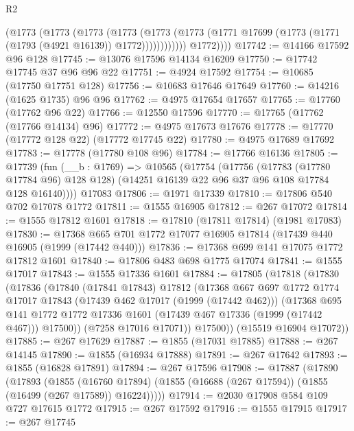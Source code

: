 \begin{lexlean}{R2}
\begin{coremodule}
                  (@1773
                    (@1773
                      (@1773
                        (@1773
                          (@1773
                            (@1773
                              (@1771 @17699 (@1773 (@1771 (@1793 (@4921 @16139)) @1772))))))))))))
            @1772))))
@17742 := @14166 @17592 @96 @128
@17745 := @13076 @17596 @14134 @16209
@17750 := @17742 @17745 @37 @96 @96 @22
@17751 := @4924 @17592
@17754 := @10685 (@17750 @17751 @128)
@17756 := @10683 @17646 @17649
@17760 := @14216 (@1625 @1735) @96 @96
@17762 := @4975 @17654 @17657
@17765 := @17760 (@17762 @96 @22)
@17766 := @12550 @17596
@17770 := @17765 (@17762 (@17766 @14134) @96)
@17772 := @4975 @17673 @17676
@17778 := @17770 (@17772 @128 @22) (@17772 @17745 @22)
@17780 := @4975 @17689 @17692
@17783 := @17778 (@17780 @108 @96)
@17784 := @17766 @16136
@17805 := @17739
    (fun (__b : @1769) =>
    @10565
      (@17754
        (@17756
          (@17783 (@17780 @17784 @96) @128 @128)
          (@14251 @16139 @22 @96 @37 @96 @108 @17784 @128 @16140))))
    @17083
@17806 := @1971 @17339
@17810 := @17806 @540 @702 @17078 @1772
@17811 := @1555 @16905
@17812 := @267 @17072
@17814 := @1555 @17812 @1601
@17818 := @17810 (@17811 @17814) (@1981 @17083)
@17830 := @17368 @665 @701 @1772 @17077 @16905 @17814 (@17439 @440 @16905 (@1999 (@17442 @440)))
@17836 := @17368 @699 @141 @17075 @1772 @17812 @1601
@17840 := @17806 @483 @698 @1775 @17074
@17841 := @1555 @17017
@17843 := @1555 @17336 @1601
@17884 := @17805
    (@17818
      (@17830
        (@17836
          (@17840
            (@17841 @17843)
            @17812
            (@17368
              @667
              @697
              @1772
              @1774
              @17017
              @17843
              (@17439 @462 @17017 (@1999 (@17442 @462)))
              (@17368
                @695
                @141
                @1772
                @1772
                @17336
                @1601
                (@17439 @467 @17336 (@1999 (@17442 @467)))
                @17500))
            (@7258 @17016 @17071))
          @17500))
      (@15519 @16904 @17072))
@17885 := @267 @17629
@17887 := @1855 (@17031 @17885)
@17888 := @267 @14145
@17890 := @1855 (@16934 @17888)
@17891 := @267 @17642
@17893 := @1855 (@16828 @17891)
@17894 := @267 @17596
@17908 := @17887
    (@17890
      (@17893
        (@1855
          (@16760 @17894)
          (@1855 (@16688 (@267 @17594)) (@1855 (@16499 (@267 @17589)) @16224)))))
@17914 := @2030 @17908 @584 @109 @727 @17615 @1772
@17915 := @267 @17592
@17916 := @1555 @17915
@17917 := @267 @17745

\end{coremodule}
\end{lexlean}
